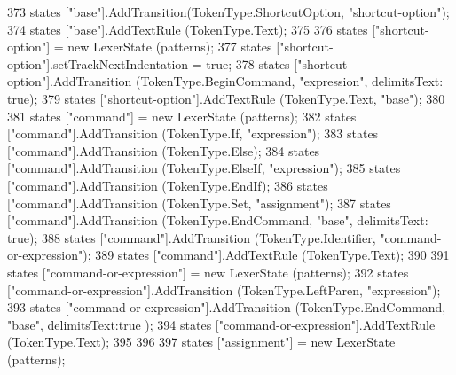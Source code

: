 \begin{DoxyCode}
373             states [\textcolor{stringliteral}{"base"}].AddTransition(TokenType.ShortcutOption, \textcolor{stringliteral}{"shortcut-option"});
374             states [\textcolor{stringliteral}{"base"}].AddTextRule (TokenType.Text);
375 
376             states [\textcolor{stringliteral}{"shortcut-option"}] = \textcolor{keyword}{new} LexerState (patterns);
377             states [\textcolor{stringliteral}{"shortcut-option"}].setTrackNextIndentation = \textcolor{keyword}{true};
378             states [\textcolor{stringliteral}{"shortcut-option"}].AddTransition (TokenType.BeginCommand, \textcolor{stringliteral}{"expression"}, delimitsText: \textcolor{keyword}{
      true});
379             states [\textcolor{stringliteral}{"shortcut-option"}].AddTextRule (TokenType.Text, \textcolor{stringliteral}{"base"});
380 
381             states [\textcolor{stringliteral}{"command"}] = \textcolor{keyword}{new} LexerState (patterns);
382             states [\textcolor{stringliteral}{"command"}].AddTransition (TokenType.If, \textcolor{stringliteral}{"expression"});
383             states [\textcolor{stringliteral}{"command"}].AddTransition (TokenType.Else);
384             states [\textcolor{stringliteral}{"command"}].AddTransition (TokenType.ElseIf, \textcolor{stringliteral}{"expression"});
385             states [\textcolor{stringliteral}{"command"}].AddTransition (TokenType.EndIf);
386             states [\textcolor{stringliteral}{"command"}].AddTransition (TokenType.Set, \textcolor{stringliteral}{"assignment"});
387             states [\textcolor{stringliteral}{"command"}].AddTransition (TokenType.EndCommand,  \textcolor{stringliteral}{"base"}, delimitsText: \textcolor{keyword}{true});
388             states [\textcolor{stringliteral}{"command"}].AddTransition (TokenType.Identifier, \textcolor{stringliteral}{"command-or-expression"});
389             states [\textcolor{stringliteral}{"command"}].AddTextRule (TokenType.Text);
390 
391             states [\textcolor{stringliteral}{"command-or-expression"}] = \textcolor{keyword}{new} LexerState (patterns);
392             states [\textcolor{stringliteral}{"command-or-expression"}].AddTransition (TokenType.LeftParen, \textcolor{stringliteral}{"expression"});
393             states [\textcolor{stringliteral}{"command-or-expression"}].AddTransition (TokenType.EndCommand, \textcolor{stringliteral}{"base"}, delimitsText:\textcolor{keyword}{true}
      );
394             states [\textcolor{stringliteral}{"command-or-expression"}].AddTextRule (TokenType.Text);
395 
396 
397             states [\textcolor{stringliteral}{"assignment"}] = \textcolor{keyword}{new} LexerState (patterns);

\end{DoxyCode}
